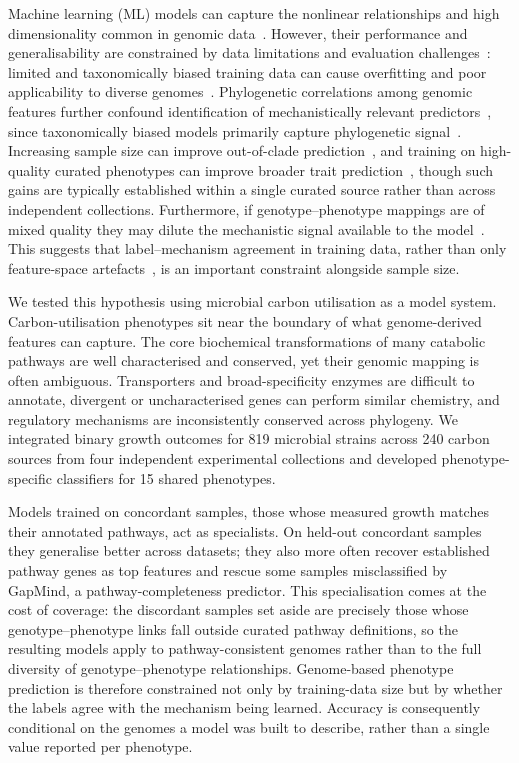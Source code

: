 Machine learning (ML) models can capture the nonlinear relationships and high dimensionality common in genomic data~\cite{Greener2022-dy,Zampieri2019MLMetabolic,James2025OpenProblems,Park2024SensorTaxonomy}.
However, their performance and generalisability are constrained by data limitations and evaluation challenges~\cite{Whalen2022Pitfalls,Shi2025OOD}: limited and taxonomically biased training data can cause overfitting and poor applicability to diverse genomes~\cite{Whalen2022Pitfalls,Ramoneda2024-yb,Albright2023-ze}.
Phylogenetic correlations among genomic features further confound identification of mechanistically relevant predictors~\cite{Bradley2018-rs}, since taxonomically biased models primarily capture phylogenetic signal~\cite{Li2023-up}.
Increasing sample size can improve out-of-clade prediction~\cite{Li2023-up}, and training on high-quality curated phenotypes can improve broader trait prediction~\cite{Koblitz2025Phenotype}, though such gains are typically established within a single curated source rather than across independent collections.
Furthermore, if genotype--phenotype mappings are of mixed quality they may dilute the mechanistic signal available to the model~\cite{Frenay2014LabelNoise,James2025OpenProblems}.
This suggests that label--mechanism agreement in training data, rather than only feature-space artefacts~\cite{Austin2025DEBIAS}, is an important constraint alongside sample size.

We tested this hypothesis using microbial carbon utilisation as a model system.
Carbon-utilisation phenotypes sit near the boundary of what genome-derived features can capture.
The core biochemical transformations of many catabolic pathways are well characterised and conserved, yet their genomic mapping is often ambiguous.
Transporters and broad-specificity enzymes are difficult to annotate, divergent or uncharacterised genes can perform similar chemistry, and regulatory mechanisms are inconsistently conserved across phylogeny.
We integrated binary growth outcomes for 819 microbial strains across 240 carbon sources from four independent experimental collections and developed phenotype-specific classifiers for 15 shared phenotypes.

Models trained on concordant samples, those whose measured growth matches their annotated pathways, act as specialists.
On held-out concordant samples they generalise better across datasets; they also more often recover established pathway genes as top features and rescue some samples misclassified by GapMind, a pathway-completeness predictor.
This specialisation comes at the cost of coverage: the discordant samples set aside are precisely those whose genotype--phenotype links fall outside curated pathway definitions, so the resulting models apply to pathway-consistent genomes rather than to the full diversity of genotype--phenotype relationships.
Genome-based phenotype prediction is therefore constrained not only by training-data size but by whether the labels agree with the mechanism being learned.
Accuracy is consequently conditional on the genomes a model was built to describe, rather than a single value reported per phenotype.
